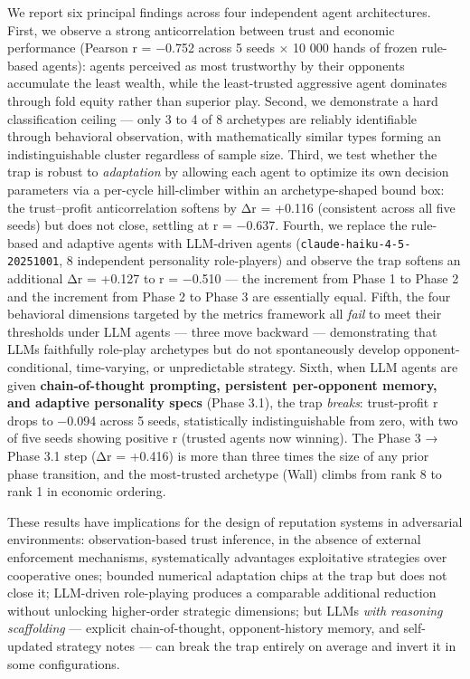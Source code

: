 \documentclass[
]{article}
\begin{document}
We report six principal findings across four independent agent
architectures. First, we observe a strong anticorrelation between trust
and economic performance (Pearson r = −0.752 across 5 seeds × 10 000
hands of frozen rule-based agents): agents perceived as most trustworthy
by their opponents accumulate the least wealth, while the least-trusted
aggressive agent dominates through fold equity rather than superior
play. Second, we demonstrate a hard classification ceiling --- only 3 to
4 of 8 archetypes are reliably identifiable through behavioral
observation, with mathematically similar types forming an
indistinguishable cluster regardless of sample size. Third, we test
whether the trap is robust to \emph{adaptation} by allowing each agent
to optimize its own decision parameters via a per-cycle hill-climber
within an archetype-shaped bound box: the trust--profit anticorrelation
softens by Δr = +0.116 (consistent across all five seeds) but does not
close, settling at r = −0.637. Fourth, we replace the rule-based and
adaptive agents with LLM-driven agents
(\texttt{claude-haiku-4-5-20251001}, 8 independent personality
role-players) and observe the trap softens an additional Δr = +0.127 to
r = −0.510 --- the increment from Phase 1 to Phase 2 and the increment
from Phase 2 to Phase 3 are essentially equal. Fifth, the four
behavioral dimensions targeted by the metrics framework all \emph{fail}
to meet their thresholds under LLM agents --- three move backward ---
demonstrating that LLMs faithfully role-play archetypes but do not
spontaneously develop opponent-conditional, time-varying, or
unpredictable strategy. Sixth, when LLM agents are given
\textbf{chain-of-thought prompting, persistent per-opponent memory, and
adaptive personality specs} (Phase 3.1), the trap \emph{breaks}:
trust-profit r drops to −0.094 across 5 seeds, statistically
indistinguishable from zero, with two of five seeds showing positive r
(trusted agents now winning). The Phase 3 → Phase 3.1 step (Δr = +0.416)
is more than three times the size of any prior phase transition, and the
most-trusted archetype (Wall) climbs from rank 8 to rank 1 in economic
ordering.

These results have implications for the design of reputation systems in
adversarial environments: observation-based trust inference, in the
absence of external enforcement mechanisms, systematically advantages
exploitative strategies over cooperative ones; bounded numerical
adaptation chips at the trap but does not close it; LLM-driven
role-playing produces a comparable additional reduction without
unlocking higher-order strategic dimensions; but LLMs \emph{with
reasoning scaffolding} --- explicit chain-of-thought, opponent-history
memory, and self-updated strategy notes --- can break the trap entirely
on average and invert it in some configurations.
\end{document}

